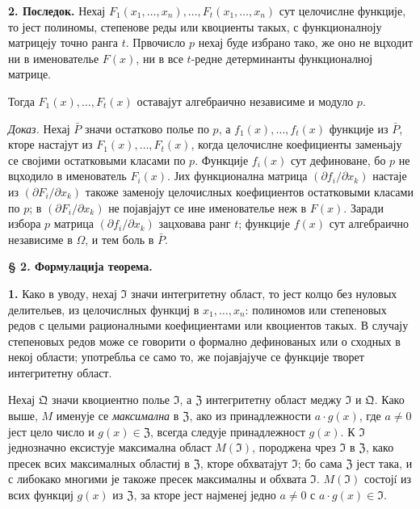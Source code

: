 \documentclass[11pt]{article}
\begin{document}
\medskip\noindent\textbf{2. Последок.}
Нехај \(F_1(x_1,\ldots,x_n),\ldots,F_t(x_1,\ldots,x_n)\) сут целочислне функције, то јест полиномы, степенове реды или квоциенты такых, с функционалноју матрицеју точно ранга \(t\). Првочисло \(p\) нехај буде избрано тако, же оно не вцходит ни в именователье \(F(x)\), ни в все \(t\)-редне детерминанты функционалној матрице.

Тогда \(F_1(x),\ldots,F_t(x)\) оставајут алгебраично независиме и модуло \(p\).

\noindent\textit{Доказ.}
Нехај \(\bar P\) значи остатково полье по \(p\), а \(f_1(x),\ldots,f_t(x)\) функције из \(\bar P\), кторе настајут из \(F_1(x),\ldots,F_t(x)\), когда целочислне коефициенты заменьају се својими остатковыми класами по \(p\). Функције \(f_i(x)\) сут дефиноване, бо \(p\) не вцходило в именователь \(F_i(x)\). Јих функционална матрица \((\partial f_i/\partial x_k)\) настаје из \((\partial F_i/\partial x_k)\) такоже заменоју целочислных коефициентов остатковыми класами по \(p\); в \((\partial F_i/\partial x_k)\) не појавјајут се ине именователье неж в \(F(x)\). Заради избора \(p\) матрица \((\partial f_i/\partial x_k)\) зацховава ранг \(t\); функције \(f(x)\) сут алгебраично независиме в \(\Omega\), и тем боль в \(\bar P\).

\bigskip
\noindent\textbf{§ 2. Формулација теорема.}

\smallskip
\noindent\textbf{1.}
Како в уводу, нехај \(\mathfrak{I}\) значи интегритетну област, то јест колцо без нуловых делительев, из целочислных функциј в \(x_1,\ldots,x_n\): полиномов или степеновых редов с целыми рационалными коефициентами или квоциентов такых. В случају степеновых редов може се говорити о формално дефинованых или о сходных в некој области; употребльа се само то, же појавјајуче се функције творет интегритетну област.

Нехај \(\mathfrak{Q}\) значи квоциентно полье \(\mathfrak{I}\), а \(\mathfrak{Z}\) интегритетну област меджу \(\mathfrak{I}\) и \(\mathfrak{Q}\). Како выше, \(M\) именује се \textit{максимална} в \(\mathfrak{Z}\), ако из принадлежности \(a\cdot g(x)\), где \(a\ne0\) јест цело число и \(g(x)\in\mathfrak{Z}\), всегда следује принадлежност \(g(x)\). К \(\mathfrak{I}\) једнозначно ексистује максимална област \(M(\mathfrak{I})\), породжена чрез \(\mathfrak{I}\) в \(\mathfrak{Z}\), како пресек всих максималных областиј в \(\mathfrak{Z}\), кторе обхватајут \(\mathfrak{I}\); бо сама \(\mathfrak{Z}\) јест така, и с либокако многими је такоже пресек максималны и обхвата \(\mathfrak{I}\). \(M(\mathfrak{I})\) состојí из всих функциј \(g(x)\) из \(\mathfrak{Z}\), за кторе јест најменеј једно \(a\ne0\) с \(a\cdot g(x)\in\mathfrak{I}\).
\end{document}
